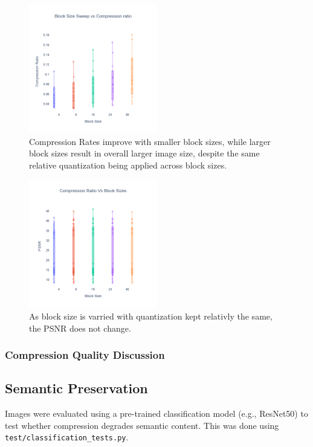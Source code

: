 \begin{figure}
    \includegraphics[width=0.5\textwidth]{assets/Comp Rate VS block Size.png}
    \caption{Compression Rates improve with smaller block sizes, while larger block sizes result in overall larger image size, despite the same relative quantization being applied across block sizes.}
    \label{fig:block_comp_rates}
\end{figure}

\begin{figure}
    \includegraphics[width=0.5\textwidth]{assets/Block Size Vs PSNR.png}
    \caption{As block size is varried with quantization kept relativly the same, the PSNR does not change.}
\end{figure}

\subsubsection{Compression Quality Discussion}


\subsection{Semantic Preservation}
Images were evaluated using a pre-trained classification model (e.g., ResNet50) to test whether compression degrades semantic content. This was done using \texttt{test/classification\_tests.py}.

